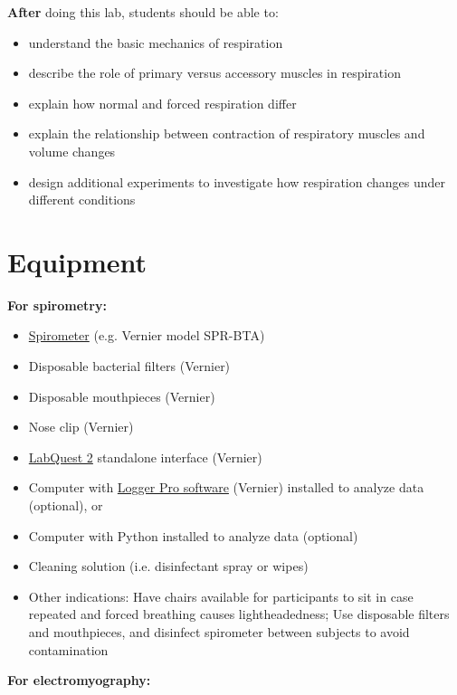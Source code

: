 \documentclass{article}
\begin{document}
\textbf{After} doing this lab, students should be able to:

\begin{itemize}
\item understand the basic mechanics of respiration
\item describe the role of primary versus accessory muscles in respiration
\item explain how normal and forced respiration differ
\item explain the relationship between contraction of respiratory muscles and volume changes
\item design additional experiments to investigate how respiration changes under different conditions
\end{itemize}

\section{Equipment}

\textbf{For spirometry:}

\begin{itemize}
\item \href{https://www.vernier.com/product/spirometer/}{Spirometer} (e.g. Vernier model SPR-BTA)
\item Disposable bacterial filters (Vernier)
\item Disposable mouthpieces (Vernier)
\item Nose clip (Vernier)
\item \href{https://www.vernier.com/product/labquest-2/}{LabQuest 2} standalone interface (Vernier)
\item Computer with \href{https://www.vernier.com/product/logger-pro-3/}{Logger Pro software} (Vernier) installed to analyze data (optional), or
\item Computer with Python installed to analyze data (optional)
\item Cleaning solution (i.e. disinfectant spray or wipes)
\item Other indications: Have chairs available for participants to sit in case repeated and forced breathing causes lightheadedness; Use disposable filters and mouthpieces, and disinfect spirometer between subjects to avoid contamination
\end{itemize}

\textbf{For electromyography:}
\end{document}
